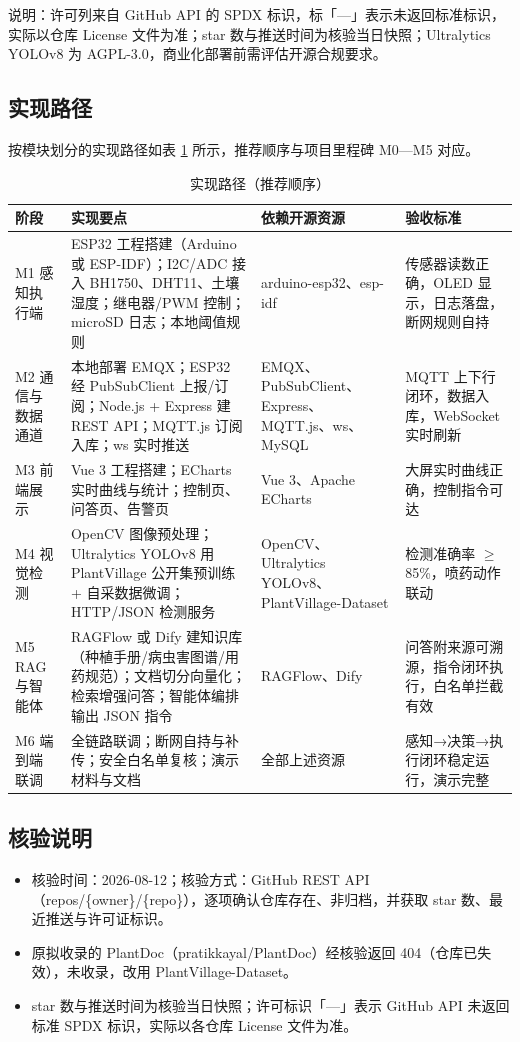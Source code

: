 \documentclass[11pt]{ctexart}
\begin{document}
说明：许可列来自 GitHub API 的 SPDX 标识，标「—」表示未返回标准标识，实际以仓库 License 文件为准；star 数与推送时间为核验当日快照；Ultralytics YOLOv8 为 AGPL-3.0，商业化部署前需评估开源合规要求。

\subsection{实现路径}
按模块划分的实现路径如表 \ref{tab:techpath} 所示，推荐顺序与项目里程碑 M0—M5 对应。
\begin{longtable}{p{2.2cm}p{6.0cm}p{4.2cm}p{2.8cm}}
  \caption{实现路径（推荐顺序）}\label{tab:techpath}\\
  \toprule
  阶段 & 实现要点 & 依赖开源资源 & 验收标准 \\
  \midrule
  M1 感知执行端 & ESP32 工程搭建（Arduino 或 ESP-IDF）；I2C/ADC 接入 BH1750、DHT11、土壤湿度；继电器/PWM 控制；microSD 日志；本地阈值规则 & arduino-esp32、esp-idf & 传感器读数正确，OLED 显示，日志落盘，断网规则自持 \\
  M2 通信与数据通道 & 本地部署 EMQX；ESP32 经 PubSubClient 上报/订阅；Node.js + Express 建 REST API；MQTT.js 订阅入库；ws 实时推送 & EMQX、PubSubClient、Express、MQTT.js、ws、MySQL & MQTT 上下行闭环，数据入库，WebSocket 实时刷新 \\
  M3 前端展示 & Vue 3 工程搭建；ECharts 实时曲线与统计；控制页、问答页、告警页 & Vue 3、Apache ECharts & 大屏实时曲线正确，控制指令可达 \\
  M4 视觉检测 & OpenCV 图像预处理；Ultralytics YOLOv8 用 PlantVillage 公开集预训练 + 自采数据微调；HTTP/JSON 检测服务 & OpenCV、Ultralytics YOLOv8、PlantVillage-Dataset & 检测准确率 $\geq$ 85\%，喷药动作联动 \\
  M5 RAG 与智能体 & RAGFlow 或 Dify 建知识库（种植手册/病虫害图谱/用药规范）；文档切分向量化；检索增强问答；智能体编排输出 JSON 指令 & RAGFlow、Dify & 问答附来源可溯源，指令闭环执行，白名单拦截有效 \\
  M6 端到端联调 & 全链路联调；断网自持与补传；安全白名单复核；演示材料与文档 & 全部上述资源 & 感知→决策→执行闭环稳定运行，演示完整 \\
  \bottomrule
\end{longtable}

\subsection{核验说明}
\begin{itemize}
  \item 核验时间：2026-08-12；核验方式：GitHub REST API（repos/\{owner\}/\{repo\}），逐项确认仓库存在、非归档，并获取 star 数、最近推送与许可证标识。
  \item 原拟收录的 PlantDoc（pratikkayal/PlantDoc）经核验返回 404（仓库已失效），未收录，改用 PlantVillage-Dataset。
  \item star 数与推送时间为核验当日快照；许可标识「—」表示 GitHub API 未返回标准 SPDX 标识，实际以各仓库 License 文件为准。
\end{itemize}
\end{document}
